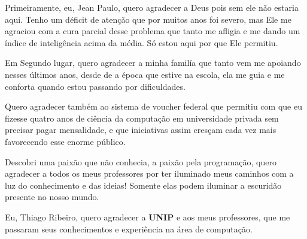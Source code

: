 \begin{agradecimentos}[AGRADECIMENTOS]
	\begin{SingleSpacing}
		
Primeiramente, eu, Jean Paulo, quero agradecer a Deus pois sem ele não estaria aqui. Tenho um déficit de atenção que por muitos anos foi severo, mas Ele me agraciou com a cura parcial desse problema que tanto me afligia e me dando um índice de inteligência acima da média. Só estou aqui por que Ele permitiu. 



Em Segundo lugar, quero agradecer a minha familía  que tanto vem me apoiando nesses últimos anos, desde de a época que estive na escola, ela me guia e me conforta quando estou passando por dificuldades. 



Quero agradecer também ao sistema de voucher federal que permitiu com que eu fizesse quatro anos de ciência da computação em universidade privada sem precisar pagar mensalidade, e que iniciativas assim cresçam cada vez mais favorecendo esse enorme público. 



Descobri uma paixão que não conhecia, a paixão pela programação, quero agradecer a todos os meus professores por ter iluminado meus caminhos com a luz do conhecimento e das ideias! Somente elas podem iluminar a escuridão presente no nosso mundo. 



Eu, Thiago Ribeiro, quero agradecer a \textbf{UNIP} e aos meus professores, que me passaram seus conhecimentos e experiência na área de computação.  
		
	\end{SingleSpacing}
\end{agradecimentos}

